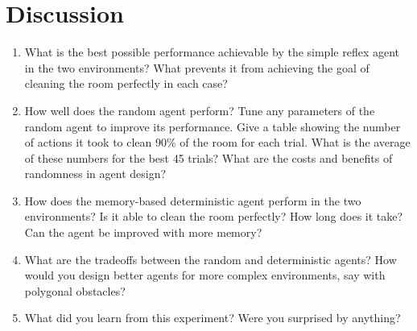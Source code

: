 \documentclass{article}
\begin{document}
\section{Discussion}
\begin{enumerate}
\item What is the best possible performance achievable by the simple reflex agent in the two environments? 
What prevents it from achieving the goal of cleaning the room perfectly in each case? 


\item How well does the random agent perform? 
Tune any parameters of the random agent to improve its performance. 
Give a table showing the number of actions it took to clean 90\% of the room for each trial. 
What is the average of these numbers for the best 45 trials? 
What are the costs and benefits of randomness in agent design? 

\item How does the memory-based deterministic agent perform in the two environments?
Is it able to clean the room perfectly? 
How long does it take? 
Can the agent be improved with more memory?

\item What are the tradeoffs between the random and deterministic agents? 
How would you design better agents for more complex environments, say with polygonal obstacles? 

\item What did you learn from this experiment? 
Were you surprised by anything? 

\end{enumerate}
\end{document}
